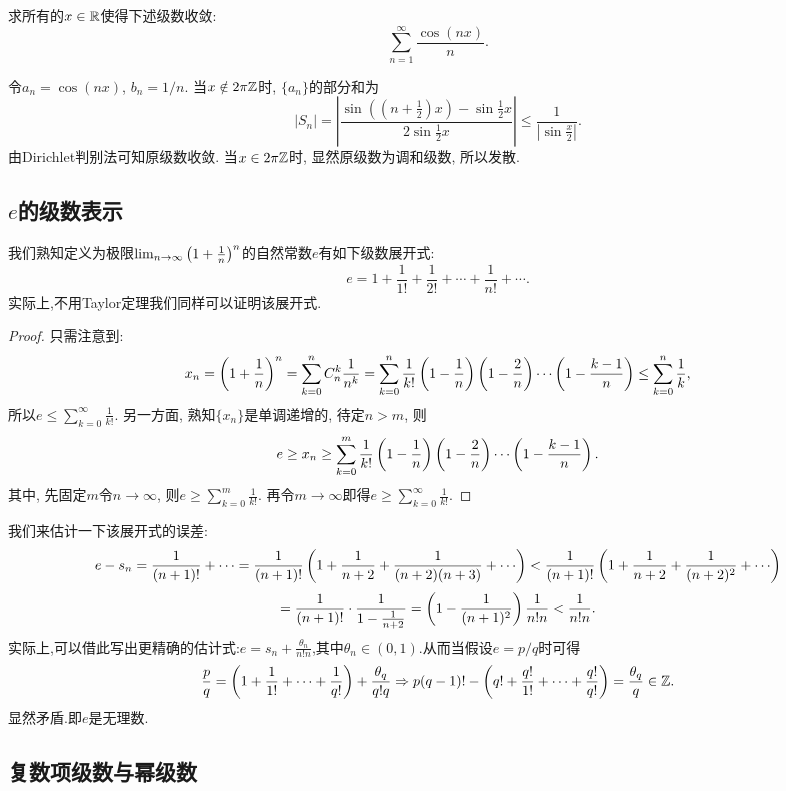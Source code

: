 \begin{example}
	求所有的$x \in \mathbb{R}$使得下述级数收敛: $$\sum_{n=1}^{\infty} \frac{\cos(nx)}{n}. $$
\end{example}
\begin{solution}
	令$a_n=\cos (nx)$, $b_n=1/n$. 当$x \notin 2\pi \mathbb{Z}$时, $\{ a_n \}$的部分和为$$|S_n| = \left| \frac{\sin ((n+\frac{1}{2})x) - \sin \frac{1}{2}x}{2\sin \frac{1}{2}x} \right| \leq \frac{1}{|\sin \frac{x}{2}|}. $$
	由Dirichlet判别法可知原级数收敛. 当$x \in 2\pi \mathbb{Z}$时, 显然原级数为调和级数, 所以发散. 
\end{solution}

\subsection{$e$的级数表示}

我们熟知定义为极限$\lim_{n\to \infty} \left( 1+\frac{1}{n} \right)^n$的自然常数$e$有如下级数展开式:$$e=1+\frac{1}{1!}+\frac{1}{2!} + \cdots + \frac{1}{n!} + \cdots .$$
实际上,不用Taylor定理我们同样可以证明该展开式. 

\begin{proof}
	只需注意到: $$x_n = \left( 1+\frac{1}{n} \right)^n = \sum_{k=0}^{n} C_n^k \frac{1}{n^k} = \sum_{k=0}^{n} \frac{1}{k!} \left( 1-\frac{1}{n} \right) \left( 1-\frac{2}{n} \right) \cdots \left( 1-\frac{k-1}{n} \right) \leq \sum_{k=0}^{n} \frac{1}{k}, $$
	所以$e \leq \sum_{k=0}^{\infty} \frac{1}{k!}$. 另一方面, 熟知$\{ x_n \}$是单调递增的, 待定$n>m$, 则$$e \geq x_n \geq \sum_{k=0}^{m} \frac{1}{k!} \left( 1-\frac{1}{n} \right) \left( 1-\frac{2}{n} \right) \cdots \left( 1-\frac{k-1}{n} \right). $$
	其中, 先固定$m$令$n \to \infty$, 则$e \geq \sum_{k=0}^{m} \frac{1}{k!}$. 再令$m \to \infty$即得$e \geq \sum_{k=0}^{\infty} \frac{1}{k!}$. 
\end{proof}

我们来估计一下该展开式的误差:
$$e-s_n = \frac{1}{(n+1)!} + \cdots = \frac{1}{(n+1)!} \ssb{1+\frac{1}{n+2} + \frac{1}{(n+2)(n+3)} + \cdots} < \frac{1}{(n+1)!} \ssb{ 1+\frac{1}{n+2}+\frac{1}{(n+2)^2}+\cdots }$$
$$= \frac{1}{(n+1)!} \cdot \frac{1}{1-\frac{1}{n+2}} = \left( 1-\frac{1}{(n+1)^2} \right) \frac{1}{n!n} < \frac{1}{n!n}.$$
实际上,可以借此写出更精确的估计式:$e=s_n+\frac{\theta _n}{n!n}$,其中$\theta _n \in (0,1)$.从而当假设$e=p/q$时可得$$\frac{p}{q} = \left( 1+\frac{1}{1!} + \cdots + \frac{1}{q!} \right) + \frac{\theta _q}{q!q} \Rightarrow p(q-1)!-\left( q!+\frac{q!}{1!} + \cdots + \frac{q!}{q!} \right) = \frac{\theta _q}{q} \in \mathbb{Z}.$$
显然矛盾.即$e$是无理数.

\subsection{复数项级数与幂级数}

